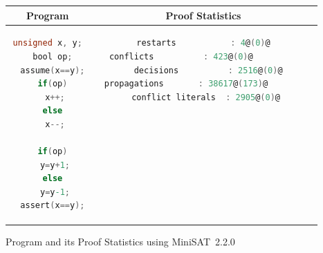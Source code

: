 \begin{figure}[t]
\centering
\small
\begin{tabular}{|c|c|}
\hline
  Program & Proof Statistics \\
\hline
\scriptsize
\begin{lstlisting}[mathescape=true,language=C,style=base]
  unsigned x, y;
  bool op;
  assume(x==y);
  if(op)
   x++;
  else
   x--;

  if(op)
   y=y+1;
  else
   y=y-1;
  assert(x==y);
\end{lstlisting}
&
\begin{lstlisting}[mathescape=true,language=C,style=base]
  restarts           : 4@(0)@
  conflicts          : 423@(0)@           
  decisions          : 2516@(0)@
  propagations       : 38617@(173)@         
  conflict literals  : 2905@(0)@ 
\end{lstlisting}
\\
\hline
\end{tabular}
\caption{\label{fig:sat-program} Program and its Proof Statistics using
  MiniSAT~2.2.0}
\end{figure}
%
